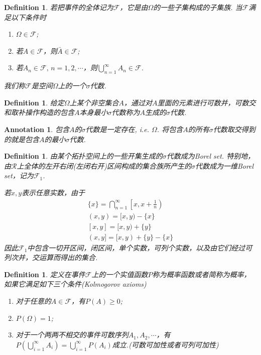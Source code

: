 \documentclass{article}
\newtheorem{definition}[theorem]{Definition}
\newtheorem{annotation}[theorem]{Annotation}
\begin{document}
\begin{definition}
\rm 若把事件的全体记为$\mathscr{F}$，它是由$\Omega$的一些子集构成的子集族. 当$\mathscr{F}$满足以下条件时
\begin{enumerate}
	\item $\Omega \in \mathscr{F}$;
	\item 若$A \in \mathscr{F}$，则$\bar{A} \in \mathscr{F}$;
	\item 若$A_n \in \mathscr{F}, \, n=1,2,\cdots$，则$\bigcup\limits_{n=1}^{\infty} A_n \in \mathscr{F}$.
\end{enumerate}
我们称$\mathscr{F}$是空间$\Omega$上的一个{\color{red}$\sigma$代数}. 
\end{definition}

\begin{definition}
\rm 给定$\Omega$上某个非空集合$A$，通过对$A$里面的元素进行可数并，可数交和取补操作构造的包含$A$本身最小$\sigma$代数称为$A${\color{red}生成}的$\sigma$代数.
\end{definition}

\begin{annotation}
\rm 包含$A$的$\sigma$代数是一定存在, i.e. $\Omega$. 将包含$A$的所有$\sigma$代数取交得到的就是包含$A$的最小$\sigma$代数. 
\end{annotation}

\begin{definition}
\rm 由某个拓扑空间上的一些开集生成的$\sigma$代数成为{\color{red}Borel set}. 特别地，由$\mathcal{R}$上全体的左开右闭(左闭右开)区间构成的集合族所产生的$\sigma$代数成为一维Borel set，记为$\mathscr{F}_1$. 

若$x,y$表示任意实数，由于
$$
\begin{array}{ll}
\{x\} =\bigcap\limits_{n=1}^{\infty}\left[x,x+\frac{1}{n}\right) \\
(x,y) = [x,y) - \{x\} \\
\left[x,y\right] = [x,y) + \{y\} \\
(x,y] = [x,y) + \{y\} - \{x\}
\end{array}
$$
因此$\mathscr{F}_1$中包含一切开区间，闭区间，单个实数，可列个实数，以及由它们经过可列次并，交运算而得出的集合. 
\end{definition}

\begin{definition}
\rm 定义在事件$\mathscr{F}$上的一个实值函数$P$称为{\color{red}概率函数}或者简称为概率，如果它满足如下三个条件(Kolmogorov axioms)
\begin{enumerate}
	\item 对于任意的$A \in \mathscr{F}$，有$P(A) \geq 0$;
	\item $P(\Omega) = 1$;
	\item 对于一个两两不相交的事件可数序列$A_1,A_2,\cdots$，有$P(\bigcup\limits_{i=1}^{\infty} A_i) = \bigcup\limits_{i=1}^{\infty}P(A_i)$成立.({\color{red}可数可加性或者可列可加性})
\end{enumerate}
\end{definition}
\end{document}
